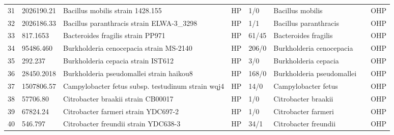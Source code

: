 \begin{longtable}{llllllll}
31  &    2026190.21 &                                         Bacillus mobilis strain 1428.155 &    HP &       1/0 &                               Bacillus mobilis &                         \cite{2026190.21,ramarao2020advanced} &   OHP \\
32  &    2026186.33 &                                Bacillus paranthracis strain ELWA-3\_3298 &    HP &       1/1 &                          Bacillus paranthracis &                                     \cite{matson2020bacillus} &   OHP \\
33  &      817.1653 &                                        Bacteroides fragilis strain PP971 &    HP &     61/45 &                           Bacteroides fragilis &                                  \cite{wexler2007bacteroides} &   OHP \\
34  &     95486.460 &                                  Burkholderia cenocepacia strain MS-2140 &    HP &     206/0 &                       Burkholderia cenocepacia &                                          \cite{csavas2017tri} &   OHP \\
35  &       292.237 &                                       Burkholderia cepacia strain IST612 &    HP &       3/0 &                           Burkholderia cepacia &                       \cite{mahenthiralingam2008burkholderia} &   OHP \\
36  &    28450.2018 &                                 Burkholderia pseudomallei strain haikou8 &    HP &     168/0 &                      Burkholderia pseudomallei &                                    \cite{mangalea2017nitrate} &   OHP \\
37  &    1507806.57 &                        Campylobacter fetus subsp. testudinum strain wqj4 &    HP &      14/0 &                            Campylobacter fetus &                                             \cite{li2016case} &   OHP \\
38  &      57706.80 &                                       Citrobacter braakii strain CB00017 &    HP &       1/0 &                            Citrobacter braakii &                                    \cite{hirai2016bacteremia} &   OHP \\
39  &      67824.24 &                                      Citrobacter farmeri strain YDC697-2 &    HP &       1/0 &                            Citrobacter farmeri &                \cite{yuan2019comparative,babiker2020clinical} &   OHP \\
40  &       546.797 &                                     Citrobacter freundii strain YDC638-3 &    HP &      34/1 &                           Citrobacter freundii &                                    \cite{yuan2019comparative} &   OHP \\

\end{longtable}

